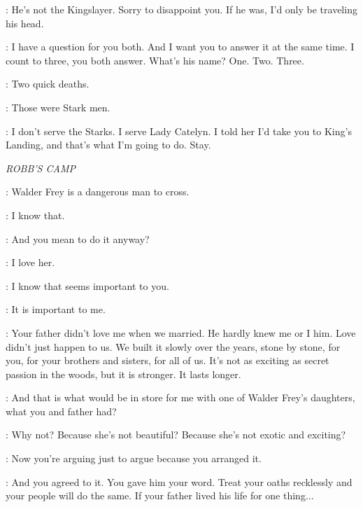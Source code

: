 \BRIENNE: He's not the Kingslayer. Sorry to disappoint you. If he was, I'd only be traveling his head. 

\STARKSOLDIERb: I have a question for you both. And I want you to answer it at the same time. I count to three, you both answer. What's his name? One. Two. Three. 

\enlargethispage*{20pt}

\BRIENNE: Two quick deaths. 


\JAIME: Those were Stark men. 

\BRIENNE: I don't serve the Starks. I serve Lady Catelyn. I told her I'd take you to King's Landing, and that's what I'm going to do. Stay.


\scene

\textit{ROBB'S CAMP} 


\CATELYN: Walder Frey is a dangerous man to cross. 

\ROBB: I know that. 

\CATELYN: And you mean to do it anyway? 

\ROBB: I love her. 

\CATELYN: I know that seems important to you. 

\ROBB: It is important to me. 

\CATELYN: Your father didn't love me when we married. He hardly knew me or I him. Love didn't just happen to us. We built it slowly over the years, stone by stone, for you, for your brothers and sisters, for all of us. It's not as exciting as secret passion in the woods, but it is stronger. It lasts longer. 

\ROBB: And that is what would be in store for me with one of Walder Frey's daughters, what you and father had? 

\CATELYN: Why not? Because she's not beautiful? Because she's not exotic and exciting? 

\ROBB: Now you're arguing just to argue because you arranged it. 

\CATELYN: And you agreed to it. You gave him your word. Treat your oaths recklessly and your people will do the same. If your father lived his life for one thing$\ldots$  

